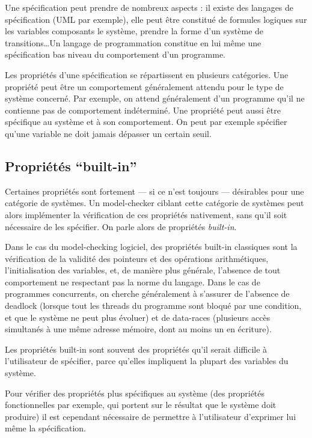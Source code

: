 Une spécification peut prendre de nombreux aspects : il existe des langages de
spécification (UML par exemple), elle peut être constitué de formules logiques
sur les variables composants le système, prendre la forme d'un système de
transitions\dots Un langage de programmation constitue en lui même une
spécification bas niveau du comportement d'un programme.

Les propriétés d'une spécification se répartissent en plusieurs catégories. Une
propriété peut être un comportement généralement attendu pour le type de système
concerné. Par exemple, on attend généralement d'un programme qu'il ne contienne
pas de comportement indéterminé. Une propriété peut aussi être spécifique au
système et à son comportement. On peut par exemple spécifier qu'une variable ne
doit jamais dépasser un certain seuil.

\subsection{\texorpdfstring{Propriétés ``built-in''}{Propriétés built-in}}

Certaines propriétés sont fortement --- si ce n'est toujours --- désirables
pour une catégorie de systèmes. Un model-checker ciblant cette catégorie
de systèmes peut alors implémenter la vérification de ces propriétés
nativement, sans qu'il soit nécessaire de les spécifier. On parle alors
de propriétés \emph{built-in}.

Dans le cas du model-checking logiciel, des propriétés built-in
classiques sont la vérification de la validité des pointeurs et des
opérations arithmétiques, l'initialisation des variables, et, de manière
plus générale, l'absence de tout comportement ne respectant pas la norme
du langage.
Dans le cas de programmes concurrents, on cherche généralement à s'assurer de
l'absence de deadlock (lorsque tout les threads du programme sont bloqué par une
condition, et que le système ne peut plus évoluer) et de data-races (plusieurs
accès simultanés à une même adresse mémoire, dont au moins un en écriture).

Les propriétés built-in sont souvent des propriétés qu'il serait difficile à
l'utilisateur de spécifier, parce qu'elles impliquent la plupart des variables
du système.

Pour vérifier des propriétés plus spécifiques au système (des propriétés
fonctionnelles par exemple, qui portent sur le résultat que le système doit
produire) il est cependant nécessaire de permettre à l'utilisateur d'exprimer
lui même la spécification.

